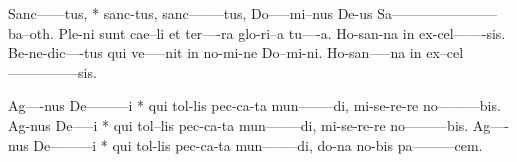 \documentclass[twoside]{article}
\begin{document}
\begin{gregosheet}
            {   Sanc------tus, * sanc-tus,   sanc--------tus,   Do-----mi--nus De-us  Sa-----------------------ba--oth. Ple-ni sunt cae--li et ter----ra     glo-ri--a  tu----a.   Ho-san-na  in ex-cel-------sis.   Be-ne-dic----tus qui ve-----nit    in no-mi-ne Do--mi-ni.  Ho-san-----na    in ex--cel---------------sis.}
\end{gregosheet}

\begin{gregosheet}
            {   Ag----nus De---------i  * qui tol-lis pec-ca-ta mun--------di,  mi-se-re-re      no---------bis.  Ag-nus De-----i  * qui tol--lis pec-ca-ta mun--------di,  mi-se-re-re      no---------bis.  Ag----nus De---------i  * qui tol-lis pec-ca-ta mun--------di,  do-na no-bis     pa---------cem.}
\end{gregosheet}
\end{document}

